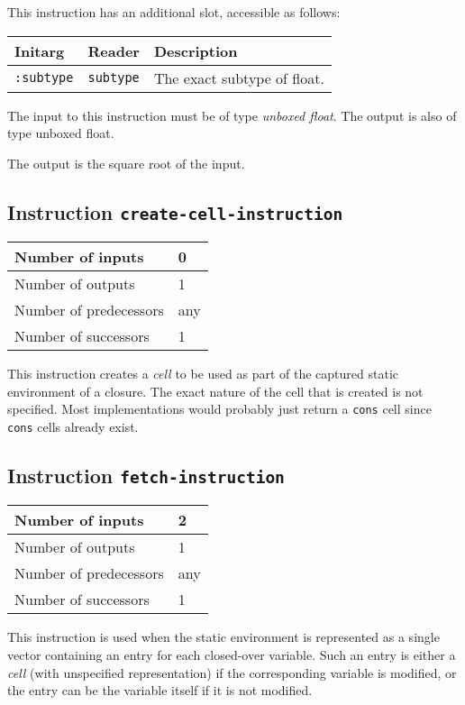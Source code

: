 This instruction has an additional slot, accessible as follows:

\begin{tabular}{|l|l|l|}
  \hline
  Initarg & Reader & Description\\
  \hline\hline
  \texttt{:subtype} & \texttt{subtype} & The exact subtype of float.\\
  \hline
\end{tabular}

The input to this instruction must be of type \emph{unboxed
  float}. The output is also of type unboxed float.

The output is the square root of the input.

\subsection{Instruction \texttt{create-cell-instruction}}
\label{hir-instruction-create-cell}

\begin{tabular}{|l|l|}
\hline
Number of inputs & 0\\
\hline
Number of outputs & 1\\
\hline
Number of predecessors & any\\
\hline
Number of successors & 1\\
\hline
\end{tabular}

This instruction creates a \emph{cell} to be used as part of the
captured static environment of a closure.  The exact nature of the
cell that is created is not specified.  Most implementations would
probably just return a \texttt{cons} cell since \texttt{cons} cells
already exist.

\subsection{Instruction \texttt{fetch-instruction}}
\label{hir-instruction-fetch}

\begin{tabular}{|l|l|}
\hline
Number of inputs & 2\\
\hline
Number of outputs & 1\\
\hline
Number of predecessors & any\\
\hline
Number of successors & 1\\
\hline
\end{tabular}

This instruction is used when the static environment is represented as
a single vector containing an entry for each closed-over variable.
Such an entry is either a \emph{cell} (with unspecified
representation) if the corresponding variable is modified, or the
entry can be the variable itself if it is not modified.

